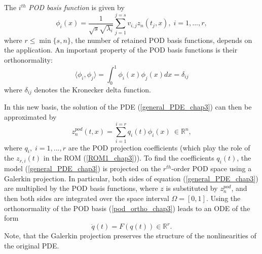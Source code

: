 \documentclass[letterpaper,conference,onecolumn,11pt]{IEEEtran}
\begin{document}
The $i^{th}$ \textit{POD basis function} is given by
\begin{equation}\label{pod_basis_chap3}
\phi_{i}(x)=\frac{1}{\sqrt{s}\sqrt{\lambda_{i}}}\sum_{j=1}^{j=s}v_{i,j}z_n (t_{j},x),\;i=1,...,r,
\end{equation}
where $r \leq \min \{s,n \}$, the number of retained POD basis
functions, depends on the application. An important property of the
POD basis functions is their orthonormality:
\begin{equation}\label{pod_ortho_chap3}
\langle \phi_{i},\phi_{j}\rangle =\int_{0}^{1}\phi_{i}(x)\phi_{j}(x)dx=\delta_{ij}
\end{equation}
where $\delta_{ij}$ denotes the Kronecker delta function.

In this new basis, the solution of the PDE (\ref{general_PDE_chap3})
can then be approximated by
\begin{equation}\label{pod_proj_chap3}
z_n^{pod}(t,x)=\sum_{i=1}^{i=r}q_{i}(t) \phi_{i}(x) \ \in \mathbb{R}^n,
\end{equation}
where $q_{i},\;i=1,...,r$ are the POD projection
coefficients (which play the role of the $z_{r,i}(t)$ in the ROM
(\ref{ROM1_chap3})).
To find the coefficients $q_i(t)$, the model (\ref{general_PDE_chap3}) is
projected on the $r^{th}$-order POD space using a Galerkin
projection. In particular, both sides of equation (\ref{general_PDE_chap3})
are multiplied by the POD basis functions, where $z$ is
substituted by $z_n^{pod}$, and then both sides are integrated over
the space interval $\Omega = [0,1]$. Using the orthonormality
of the POD basis (\ref{pod_ortho_chap3}) leads to an ODE of the form
\begin{equation}\label{ROM2_chap3}
\dot{q}(t) =F(q(t)) \in \mathbb{R}^{r}.
\end{equation}
Note, that the Galerkin projection preserves the structure of the nonlinearities of the original PDE.
\end{document}
